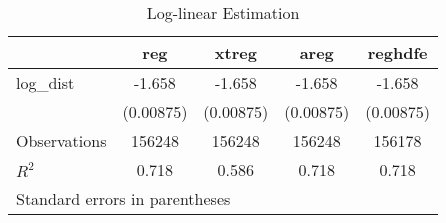 \begin{table}[htbp]\centering
\caption{Log-linear Estimation}
\begin{tabular}{l*{4}{c}}
\hline\hline
                    &\multicolumn{1}{c}{reg}&\multicolumn{1}{c}{xtreg}&\multicolumn{1}{c}{areg}&\multicolumn{1}{c}{reghdfe}\\
\hline
log\_dist            &      -1.658&      -1.658&      -1.658&      -1.658\\
                    &   (0.00875)&   (0.00875)&   (0.00875)&   (0.00875)\\
\hline
Observations        &      156248&      156248&      156248&      156178\\
\(R^{2}\)           &       0.718&       0.586&       0.718&       0.718\\
\hline\hline
\multicolumn{5}{l}{\footnotesize Standard errors in parentheses}\\
\end{tabular}
\end{table}
